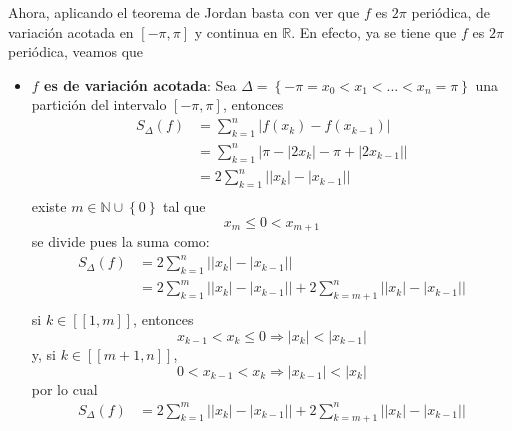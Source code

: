 \documentclass[12pt]{report}
\newcounter{it}
\theoremstyle{largebreak}
\renewcommand{\leq}{\ensuremath{\leqslant}}
\newcommand\abs[1]{\ensuremath{\left|#1\right|}}
\newcommand{\natint}[1]{\ensuremath{\left[\!\left[#1\right]\!\right]}}
\begin{document}
\begin{sol}
        Ahora, aplicando el teorema de Jordan basta con ver que $f$ es $2\pi$ periódica, de variación acotada en $[-\pi,\pi]$ y continua en $\mathbb{R}$. En efecto, ya se tiene que $f$ es $2\pi$ periódica, veamos que
        \begin{itemize}
            \item \textbf{$f$ es de variación acotada}: Sea $\Delta=\left\{-\pi=x_0<x_1<...<x_n=\pi \right\}$ una partición del intervalo $[-\pi,\pi]$, entonces
            \begin{equation*}
                \begin{split}
                    S_\Delta(f)&=\sum_{ k=1}^n\abs{f(x_k)-f(x_{k-1})}\\
                    &=\sum_{ k=1}^n\abs{\pi-\abs{2x_k}-\pi+\abs{2x_{ k-1}}}\\
                    &=2\sum_{ k=1}^n\abs{\abs{x_k}-\abs{x_{ k-1}}}\\
                \end{split}
            \end{equation*}
            existe $m\in\mathbb{N}\cup\left\{0\right\}$ tal que
            \begin{equation*}
                x_{m}\leq0<x_{ m+1}
            \end{equation*}
            se divide pues la suma como:
            \begin{equation*}
                \begin{split}
                    S_\Delta(f)&=2\sum_{ k=1}^n\abs{\abs{x_k}-\abs{x_{ k-1}}}\\
                    &=2\sum_{ k=1}^m\abs{\abs{x_k}-\abs{x_{ k-1}}}+2\sum_{ k=m+1}^n\abs{\abs{x_k}-\abs{x_{ k-1}}}\\
                \end{split}
            \end{equation*}
            si $k\in\natint{1,m}$, entonces
            \begin{equation*}
                x_{ k-1}<x_k\leq0\Rightarrow \abs{x_k}<\abs{x_{ k-1}}
            \end{equation*}
            y, si $k\in\natint{m+1,n}$,
            \begin{equation*}
                0<x_{ k-1}<x_{k}\Rightarrow \abs{x_{ k-1}}<\abs{x_k}
            \end{equation*}
            por lo cual
            \begin{equation*}
                \begin{split}
                    S_\Delta(f)&=2\sum_{ k=1}^m\abs{\abs{x_k}-\abs{x_{ k-1}}}+2\sum_{ k=m+1}^n\abs{\abs{x_k}-\abs{x_{ k-1}}}\\

\end{split}
\end{equation*}
\end{itemize}
\end{sol}
\end{document}
